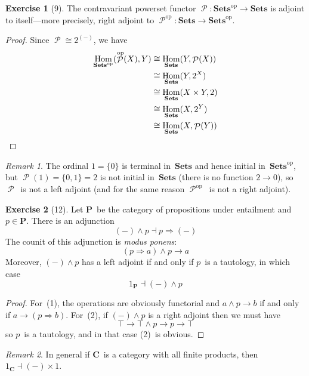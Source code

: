 \documentclass[letterpaper,12pt]{article}
\newcommand{\true}{\top}
\newcommand{\iso}{\cong}
\newcommand{\adj}{\dashv}
\newcommand{\limplies}{\Rightarrow}
\DeclareMathOperator{\Hom}{Hom}
\DeclareMathOperator{\pow}{\mathcal{P}}
\newcommand{\cat}[1]{\mathbf{#1}}
\newcommand{\dual}[1]{#1^{\mathrm{op}}}
\newcommand{\C}{\cat{C}}
\renewcommand{\P}{\cat{P}}
\newcommand{\Sets}{\cat{Sets}}
\newcommand{\Setsop}{\dual{\Sets}}
\theoremstyle{definition}
\newtheorem*{exer}{Exercise}
\theoremstyle{remark}
\newtheorem*{rmk}{Remark}
\theoremstyle{direction}
\begin{document}
\begin{exer}[9]
The contravariant powerset functor \(\pow:\Setsop\to\Sets\) is adjoint to itself---more precisely, right adjoint to \(\dual{\pow}:\Sets\to\Setsop\).
\end{exer}
\begin{proof}
Since \(\pow\iso2^{(-)}\), we have
\begin{align*}
\Hom_{\Setsop}(\dual{\pow}(X),Y)&\iso\Hom_{\Sets}(Y,\pow(X))\\
	&\iso\Hom_{\Sets}(Y,2^X)\\
	&\iso\Hom_{\Sets}(X\times Y,2)\\
	&\iso\Hom_{\Sets}(X,2^Y)\\
	&\iso\Hom_{\Sets}(X,\pow(Y))\qedhere
\end{align*}
\end{proof}
\begin{rmk}
The ordinal \(1=\{0\}\) is terminal in~\(\Sets\) and hence initial in~\(\Setsop\), but \(\pow(1)=\{0,1\}=2\) is not initial in~\(\Sets\) (there is no function \(2\to0\)), so \(\pow\)~is not a left adjoint (and for the same reason \(\dual{\pow}\)~is not a right adjoint).
\end{rmk}

\begin{exer}[12]
Let \(\P\)~be the category of propositions under entailment and \(p\in\P\). There is an adjunction
\[(-)\land p\adj p\limplies(-)\tag{1}\]
The counit of this adjunction is \emph{modus ponens}:
\[(p\limplies a)\land p\to a\]
Moreover, \((-)\land p\) has a left adjoint if and only if \(p\)~is a tautology, in which case
\[1_{\P}\adj(-)\land p\tag{2}\]
\end{exer}
\begin{proof}
For~(1), the operations are obviously functorial and \(a\land p\to b\) if and only if \(a\to(p\limplies b)\). For~(2), if \((-)\land p\) is a right adjoint then we must have
\[\true\to\true\land p\to p\to\true\]
so \(p\)~is a tautology, and in that case (2)~is obvious.
\end{proof}
\begin{rmk}
In general if \(\C\)~is a category with all finite products, then \(1_{\C}\adj(-)\times 1\).
\end{rmk}
\end{document}
